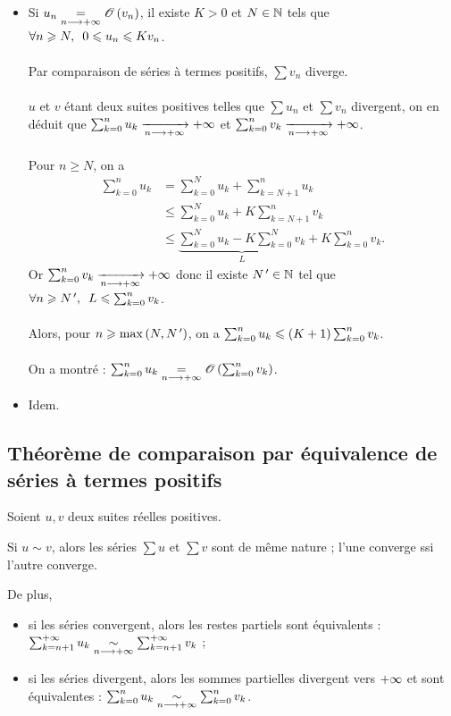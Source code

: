 \begin{dem}
\begin{itemize}
    \item Si \(u_n\underset{n\longrightarrow+\infty}{=}\mathscr{O}\left(v_n\right)\), il existe \(K>0\) et \(N\in\mathbb{N}\) tels que \(\quantifs{\forall n\geq N}0\leq u_n\leq Kv_n\). \\\\ Par comparaison de séries à termes positifs, \(\sum v_n\) diverge. \\\\ \(u\) et \(v\) étant deux suites positives telles que \(\sum u_n\) et \(\sum v_n\) divergent, on en déduit que \(\sum_{k=0}^nu_k\xrightarrow[n\longrightarrow+\infty]{}+\infty\) et \(\sum_{k=0}^nv_k\xrightarrow[n\longrightarrow+\infty]{}+\infty\). \\\\ Pour \(n\geq N\), on a \[\begin{aligned}
        \sum_{k=0}^nu_k&=\sum_{k=0}^Nu_k+\sum_{k=N+1}^nu_k \\
        &\leq\sum_{k=0}^Nu_k+K\sum_{k=N+1}^nv_k \\
        &\leq\underbrace{\sum_{k=0}^Nu_k-K\sum_{k=0}^Nv_k}_{L}+K\sum_{k=0}^nv_k.
    \end{aligned}\] Or \(\sum_{k=0}^nv_k\xrightarrow[n\longrightarrow+\infty]{}+\infty\) donc il existe \(N^{\,\prime}\in\mathbb{N}\) tel que \(\quantifs{\forall n\geq N\prim}L\leq\sum_{k=0}^nv_k\). \\\\ Alors, pour \(n\geqslant\max\left(N,N^{\,\prime}\right)\), on a \(\sum_{k=0}^nu_k\leqslant\left(K+1\right)\sum_{k=0}^nv_k\). \\\\ On a montré : \(\sum_{k=0}^nu_k\underset{n\longrightarrow+\infty}{=}\mathscr{O}\left(\sum_{k=0}^nv_k\right)\). \\
    \item Idem.
\end{itemize}
\end{dem}

\subsection{Théorème de comparaison par équivalence de séries à termes positifs}

\begin{theo}
Soient \(u,v\) deux suites réelles positives.

Si \(u\sim v\), alors les séries \(\sum u\) et \(\sum v\) sont de même nature ; l'une converge ssi l'autre converge.

De plus,

\begin{itemize}
    \item si les séries convergent, alors les restes partiels sont équivalents : \(\sum_{k=n+1}^{+\infty}u_k\underset{n\longrightarrow+\infty}{\sim}\sum_{k=n+1}^{+\infty}v_k\) ; \\
    \item si les séries divergent, alors les sommes partielles divergent vers \(+\infty\) et sont équivalentes : \(\sum_{k=0}^nu_k\underset{n\longrightarrow+\infty}{\sim}\sum_{k=0}^nv_k\).
\end{itemize}
\end{theo}

